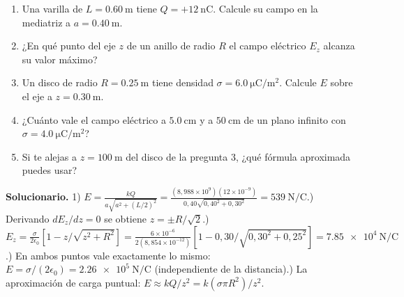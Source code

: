\documentclass[11pt]{article}
\begin{document}
\begin{enumerate}[leftmargin=*,itemsep=3pt]
  \item Una varilla de $L=\SI{0,60}{\metre}$ tiene $Q=+\SI{12}{\nano\coulomb}$. Calcule su campo en la mediatriz a $a=\SI{0,40}{\metre}$.
  \item ¿En qué punto del eje $z$ de un anillo de radio $R$ el campo eléctrico $E_z$ alcanza su valor máximo?
  \item Un disco de radio $R=\SI{0,25}{\metre}$ tiene densidad $\sigma=\SI{6,0}{\micro\coulomb\per\metre\squared}$. Calcule $E$ sobre el eje a $z=\SI{0,30}{\metre}$.
  \item ¿Cuánto vale el campo eléctrico a $\SI{5,0}{\centi\metre}$ y a $\SI{50}{\centi\metre}$ de un plano infinito con $\sigma=\SI{4,0}{\micro\coulomb\per\metre\squared}$?
  \item Si te alejas a $z=\SI{100}{\metre}$ del disco de la pregunta 3, ¿qué fórmula aproximada puedes usar?
\end{enumerate}

\medskip
{}

\medskip
{\sffamily\footnotesize\color{e10muted}\textbf{Solucionario.}
1) $E=\frac{kQ}{a\sqrt{a^2+(L/2)^2}}=\frac{(8{,}988\times10^9)(12\times10^{-9})}{0{,}40\sqrt{0{,}40^2+0{,}30^2}}=\SI{539}{\newton\per\coulomb}$.) Derivando $dE_z/dz=0$ se obtiene $z=\pm R/\sqrt{2}$.) $E_z=\frac{\sigma}{2\epsilon_0}[1-z/\sqrt{z^2+R^2}]=\frac{6\times10^{-6}}{2(8{,}854\times10^{-12})}[1-0{,}30/\sqrt{0{,}30^2+0{,}25^2}]=\SI{7,85e4}{\newton\per\coulomb}$.) En ambos puntos vale exactamente lo mismo: $E=\sigma/(2\epsilon_0)=\SI{2,26e5}{\newton\per\coulomb}$ (independiente de la distancia).) La aproximación de carga puntual: $E\approx kQ/z^2=k(\sigma\pi R^2)/z^2$.}
\end{document}
